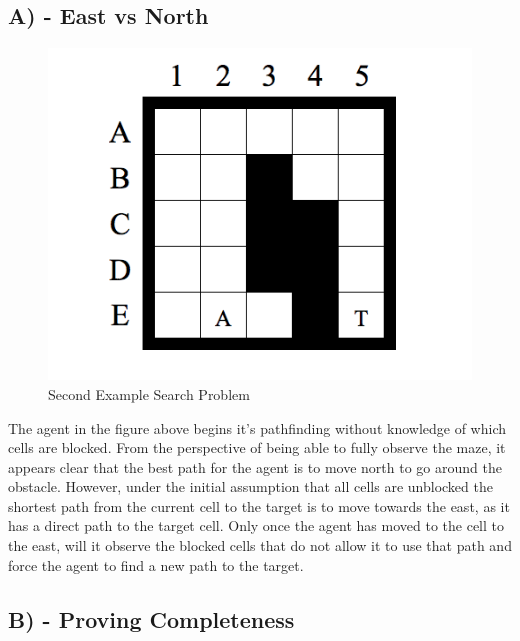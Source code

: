 \documentclass[12pt]{article}
\begin{document}
	\subsection*{A) - East vs North}
		\begin{figure}[!htb]
			\centering
			\includegraphics[width=.5\textwidth]{Figure8.png}
			\caption{\label{Figure 8: }Second Example Search Problem}
		\end{figure}
	The agent in the figure above begins it's pathfinding without knowledge of which cells are blocked.  From the perspective of being able to fully observe the maze,
	it appears clear that the best path for the agent is to move north to go around the obstacle.  However, under the initial assumption that all cells are unblocked
	the shortest path from the current cell to the target is to move towards the east, as it has a direct path to the target cell.  Only once the agent has moved to
	the cell to the east, will it observe the blocked cells that do not allow it to use that path and force the agent to find a new path to the target.
	
	\subsection*{B) - Proving Completeness}
	
\end{document}
